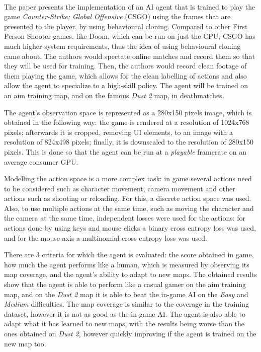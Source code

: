 \paragraph{}
The paper \cite{pearce2021counterstrike} presents the implementation of an AI agent that is trained to play the game \emph{Counter-Strike; Global Offensive} (CSGO) using the frames that are presented to the player, by using behavioural cloning. Compared to other First Person Shooter games, like Doom, which can be run on just the CPU, CSGO has much higher system requirements, thus the idea of using behavioural cloning came about. The authors would spectate online matches and record them so that they will be used for training. Then, the authors would record clean footage of them playing the game, which allows for the clean labelling of actions and also allow the agent to specialize to a high-skill policy. The agent will be trained on an aim training map, and on the famous \emph{Dust 2} map, in deathmatches.

The agent's observation space is represented as a 280x150 pixels image, which is obtained in the following way: the game is rendered at a resolution of 1024x768 pixels; afterwards it is cropped, removing UI elements, to an image with a resolution of 824x498 pixels; finally, it is downscaled to the resolution of 280x150 pixels. This is done so that the agent can be run at a \emph{playable} framerate on an average consumer GPU.

Modelling the action space is a more complex task: in game several actions need to be considered such as character movement, camera movement and other actions such as shooting or reloading. For this, a discrete action space was used. Also, to use multiple actions at the same time, such as moving the character and the camera at the same time, independent losses were used for the actions: for actions done by using keys and mouse clicks a binary cross entropy loss was used, and for the mouse axis a multinomial cross entropy loss was used.

There are 3 criteria for which the agent is evaluated: the score obtained in game, how much the agent performs like a human, which is measured by observing its map coverage, and the agent's ability to adapt to new maps. The obtained results show that the agent is able to perform like a casual gamer on the aim training map, and on the \emph{Dust 2} map it is able to beat the in-game AI on the \emph{Easy} and \emph{Medium} difficulties. The map coverage is similar to the coverage in the training dataset, however it is not as good as the in-game AI. The agent is also able to adapt what it has learned to new maps, with the results being worse than the ones obtained on \emph{Dust 2}, however quickly improving if the agent is trained on the new map too.
